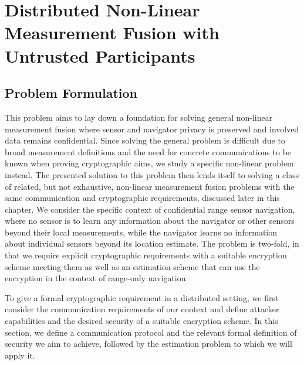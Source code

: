 
\chapter{Distributed Non-Linear Measurement Fusion with Untrusted Participants}\label{ch:nonlin_fusion}

% 
%                                              
%                                              
%                                              
% 

\section{Problem Formulation}\label{sec:nonlin_fusion:problem}
This problem aims to lay down a foundation for solving general non-linear measurement fusion where sensor and navigator privacy is preserved and involved data remains confidential. Since solving the general problem is difficult due to broad measurement definitions and the need for concrete communications to be known when proving cryptographic aims, we study a specific non-linear problem instead. The presented solution to this problem then lends itself to solving a class of related, but not exhaustive, non-linear measurement fusion problems with the same communication and cryptographic requirements, discussed later in this chapter. We consider the specific context of confidential range sensor navigation, where no sensor is to learn any information about the navigator or other sensors beyond their local measurements, while the navigator learns no information about individual sensors beyond its location estimate. The problem is two-fold, in that we require explicit cryptographic requirements with a suitable encryption scheme meeting them as well as an estimation scheme that can use the encryption in the context of range-only navigation.

To give a formal cryptographic requirement in a distributed setting, we first consider the communication requirements of our context and define attacker capabilities and the desired security of a suitable encryption scheme. In this section, we define a communication protocol and the relevant formal definition of security we aim to achieve, followed by the estimation problem to which we will apply it.

